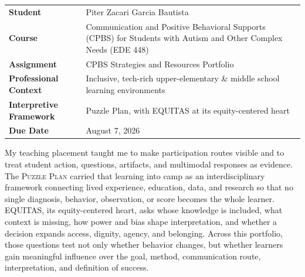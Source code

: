 \documentclass[11pt]{article}
\begin{document}
\begin{titlepage}
\vfill

\begin{center}
\renewcommand{\arraystretch}{1.18}
\setlength{\tabcolsep}{4pt}
\begin{tabular}{>{\bfseries\raggedleft\arraybackslash}p{1.90in} >{\raggedright\arraybackslash}p{5.08in}}
Student & Piter Zacari Garcia Bautista \\
Course & Communication and Positive Behavioral Supports (CPBS) for Students with Autism and Other Complex Needs (EDE 448)\\
Assignment & CPBS Strategies and Resources Portfolio \\
Professional Context & Inclusive, tech-rich upper-elementary \& middle school learning environments \\
Interpretive Framework & Puzzle Plan, with EQUITAS at its equity-centered heart \\
Due Date & August 7, 2026 \\
\end{tabular}
\end{center}

\vfill

\begin{center}
\begin{minipage}{0.94\textwidth}
\small

My teaching placement taught me to make participation routes visible and to treat student action, questions, artifacts, and multimodal responses as evidence. The \textsc{Puzzle Plan} carried that learning into camp as an interdisciplinary framework connecting lived experience, education, data, and research so that no single diagnosis, behavior, observation, or score becomes the whole learner. \textsc{EQUITAS}, its equity-centered heart, asks whose knowledge is included, what context is missing, how power and bias shape interpretation, and whether a decision expands access, dignity, agency, and belonging. Across this portfolio, those questions test not only whether behavior changes, but whether learners gain meaningful influence over the goal, method, communication route, interpretation, and definition of success.
\end{minipage}


\vspace{0.12in}
\end{center}

\restoregeometry
\end{titlepage}
\hypersetup{pageanchor=true}
\end{document}
